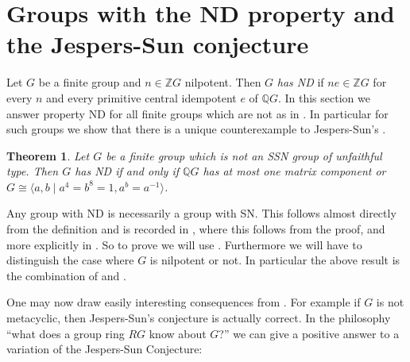 \documentclass[a4paper,10pt]{amsart}
\newtheorem{theorem}[lemma]{Theorem}
\theoremstyle{definition}
\theoremstyle{remark}
\newcommand{\Z}{{\mathbb Z}}
\newcommand{\Q}{{\mathbb Q}}
\begin{document}
\section{Groups with the ND property and the Jespers-Sun conjecture}\label{Section ND}

Let $G$ be a finite group and $n \in \Z G$ nilpotent. Then $G$ {\it has ND} if $ne \in \Z G$ for every $n$ and every primitive central idempotent $e$ of $\Q G$. In this section we answer property ND for all finite groups which are not as in . In particular for such groups we show that there is a unique counterexample to Jespers-Sun's . 

\begin{theorem}\label{th:MainTheoremNDInSection3}
Let $G$ be a finite group which is not an SSN group of unfaithful type. Then $G$ has ND if and only if $\Q G$ has at most one matrix component or $G \cong \langle a,b \mid a^4=b^8 =1, a^b =a^{-1} \rangle$.
\end{theorem}

Any group with ND is necessarily a group with SN. This follows almost directly from the definition and is recorded in \cite[Proposition 2.5]{LiuPassman09}, where this follows from the proof, and more explicitly in \cite[Proposition 3.4]{JespersSun}. So to prove  we will use . Furthermore we will have to distinguish the case where $G$ is nilpotent or not. In particular the above result is the combination of  and . 

One may now draw easily interesting consequences from . For example if $G$ is not metacyclic, then Jespers-Sun's conjecture is actually correct. In the philosophy ``what does a group ring $RG$ know about $G$?'' we can give a positive answer to a variation of the Jespers-Sun Conjecture:
\end{document}
